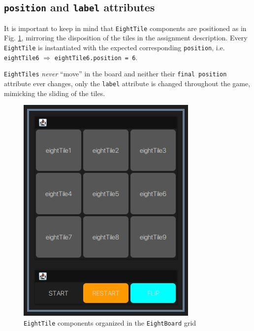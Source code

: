 \subsection{\texttt{position} and \texttt{label} attributes}
\begin{paracol}{2}
   \colfill
   It is important to keep in mind that \lstinline|EightTile| components are positioned as in Fig. \ref{fig:netBeans_board}, mirroring the disposition of the tiles in the assignment description.
   Every \lstinline|EightTile| is instantiated with the expected corresponding \lstinline|position|, i.e. \lstinline|eightTile6| $ \Rightarrow $ \lstinline|eightTile6.position = 6|.

   \lstinline|EightTiles| \textit{never} ``move'' in the board and neither their \lstinline|final position| attribute ever changes, only the \lstinline|label| attribute is changed throughout the game, mimicking the sliding of the tiles.

   \colfill
   
   
   \switchcolumn
   \begin{figure}[htbp]
      \centering
      \includegraphics{images/netBeans_board.png}
      \caption{\lstinline|EightTile| components organized in the \lstinline|EightBoard| grid}
      \label{fig:netBeans_board}
   \end{figure}
\end{paracol}
\newpage
